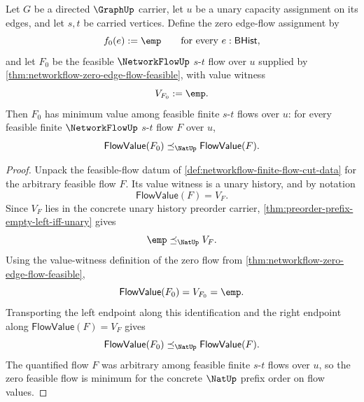 \begin{theorem}
\label{thm:networkflow-zero-feasible-flow-minimum-value}
Let $G$ be a directed $\GraphUp$ carrier, let $u$ be a unary capacity assignment on its edges, and let $s,t$ be carried vertices. Define the zero edge-flow assignment by
$$
f_0(e):=\emp
\qquad\text{for every }e:\mathsf{BHist},
$$
and let $F_0$ be the feasible $\NetworkFlowUp$ $s$-$t$ flow over $u$ supplied by \autoref{thm:networkflow-zero-edge-flow-feasible}, with value witness
$$
V_{F_0}:=\emp.
$$
Then $F_0$ has minimum value among feasible finite $s$-$t$ flows over $u$: for every feasible finite $\NetworkFlowUp$ $s$-$t$ flow $F$ over $u$,
$$
\mathsf{FlowValue}(F_0)
\preceq_{\NatUp}
\mathsf{FlowValue}(F).
$$
\end{theorem}
\begin{proof}
Unpack the feasible-flow datum of \autoref{def:networkflow-finite-flow-cut-data} for the arbitrary feasible flow $F$. Its value witness is a unary history, and by notation
$$
\mathsf{FlowValue}(F)=V_F.
$$
Since $V_F$ lies in the concrete unary history preorder carrier, \autoref{thm:preorder-prefix-empty-left-iff-unary} gives
$$
\emp\preceq_{\NatUp}V_F.
$$
Using the value-witness definition of the zero flow from \autoref{thm:networkflow-zero-edge-flow-feasible},
$$
\mathsf{FlowValue}(F_0)=V_{F_0}=\emp.
$$
Transporting the left endpoint along this identification and the right endpoint along $\mathsf{FlowValue}(F)=V_F$ gives
$$
\mathsf{FlowValue}(F_0)
\preceq_{\NatUp}
\mathsf{FlowValue}(F).
$$
The quantified flow $F$ was arbitrary among feasible finite $s$-$t$ flows over $u$, so the zero feasible flow is minimum for the concrete $\NatUp$ prefix order on flow values.
\end{proof}


